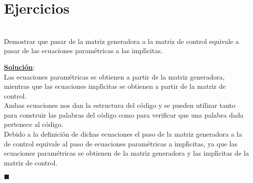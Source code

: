 %
%

\section{Ejercicios}

\begin{ejercicio}
\ \\
Demostrar que pasar de la matriz generadora a la matriz de control equivale a
pasar de las ecuaciones param\'etricas a las impl\'{\i}citas.
\end{ejercicio}
\underline{\textbf{Soluci\'on}}:\\
Las ecuaciones param\'etricas se obtienen a partir de la matriz generadora,
mientras que las ecuaciones impl\'{\i}citas se obtienen a partir de la matriz
de control.\\

Ambas ecuaciones nos dan la estructura del c\'odigo y se pueden utilizar
tanto para construir las palabras del c\'odigo como para verificar que una
palabra dada pertenece al c\'odigo.\\

Debido a la definici\'on de dichas ecuaciones el paso de la matriz generadora
a la de control equivale al paso de ecuaciones param\'etricas a impl\'{\i}citas,
ya que las ecuaciones param\'etricas se obtienen de la matriz generadora y las
impl\'{\i}citas de la matriz de control.
\begin{flushright}
$\blacksquare$
\end{flushright}
